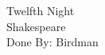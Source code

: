 \documentclass[12pt, a4paper]{article}
\begin{document}

\begin{center}
{\fonthead
\huge{Twelfth Night}\\[0.2cm]
\Large{Shakespeare}\\[0.5cm]
\large{Done By: Birdman}
}
\end{center}
\end{document}

